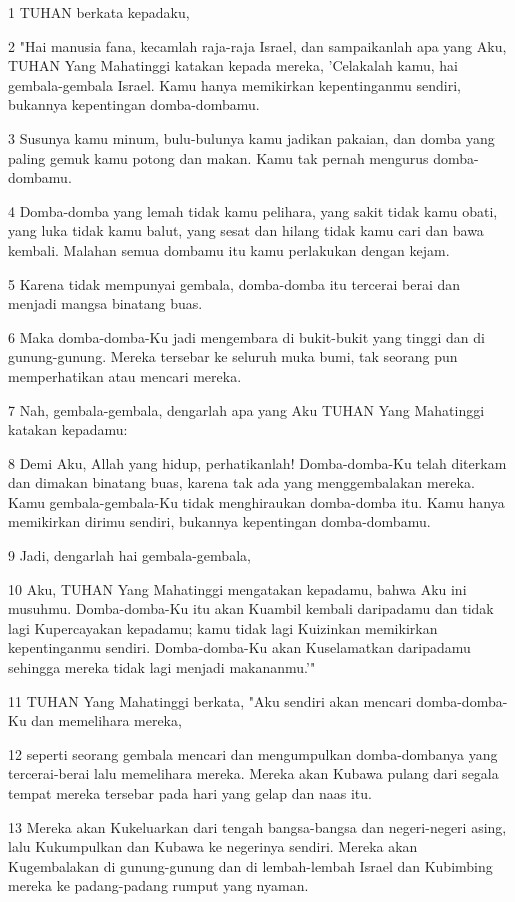 \par 1 TUHAN berkata kepadaku,
\par 2 "Hai manusia fana, kecamlah raja-raja Israel, dan sampaikanlah apa yang Aku, TUHAN Yang Mahatinggi katakan kepada mereka, 'Celakalah kamu, hai gembala-gembala Israel. Kamu hanya memikirkan kepentinganmu sendiri, bukannya kepentingan domba-dombamu.
\par 3 Susunya kamu minum, bulu-bulunya kamu jadikan pakaian, dan domba yang paling gemuk kamu potong dan makan. Kamu tak pernah mengurus domba-dombamu.
\par 4 Domba-domba yang lemah tidak kamu pelihara, yang sakit tidak kamu obati, yang luka tidak kamu balut, yang sesat dan hilang tidak kamu cari dan bawa kembali. Malahan semua dombamu itu kamu perlakukan dengan kejam.
\par 5 Karena tidak mempunyai gembala, domba-domba itu tercerai berai dan menjadi mangsa binatang buas.
\par 6 Maka domba-domba-Ku jadi mengembara di bukit-bukit yang tinggi dan di gunung-gunung. Mereka tersebar ke seluruh muka bumi, tak seorang pun memperhatikan atau mencari mereka.
\par 7 Nah, gembala-gembala, dengarlah apa yang Aku TUHAN Yang Mahatinggi katakan kepadamu:
\par 8 Demi Aku, Allah yang hidup, perhatikanlah! Domba-domba-Ku telah diterkam dan dimakan binatang buas, karena tak ada yang menggembalakan mereka. Kamu gembala-gembala-Ku tidak menghiraukan domba-domba itu. Kamu hanya memikirkan dirimu sendiri, bukannya kepentingan domba-dombamu.
\par 9 Jadi, dengarlah hai gembala-gembala,
\par 10 Aku, TUHAN Yang Mahatinggi mengatakan kepadamu, bahwa Aku ini musuhmu. Domba-domba-Ku itu akan Kuambil kembali daripadamu dan tidak lagi Kupercayakan kepadamu; kamu tidak lagi Kuizinkan memikirkan kepentinganmu sendiri. Domba-domba-Ku akan Kuselamatkan daripadamu sehingga mereka tidak lagi menjadi makananmu.'"
\par 11 TUHAN Yang Mahatinggi berkata, "Aku sendiri akan mencari domba-domba-Ku dan memelihara mereka,
\par 12 seperti seorang gembala mencari dan mengumpulkan domba-dombanya yang tercerai-berai lalu memelihara mereka. Mereka akan Kubawa pulang dari segala tempat mereka tersebar pada hari yang gelap dan naas itu.
\par 13 Mereka akan Kukeluarkan dari tengah bangsa-bangsa dan negeri-negeri asing, lalu Kukumpulkan dan Kubawa ke negerinya sendiri. Mereka akan Kugembalakan di gunung-gunung dan di lembah-lembah Israel dan Kubimbing mereka ke padang-padang rumput yang nyaman.

